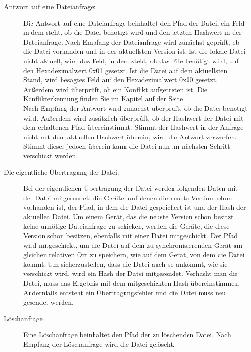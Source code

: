\begin{description}
	\item [{Antwort auf eine Dateianfrage:}]
		Die Antwort auf eine Dateianfrage beinhaltet den Pfad der Datei, ein Feld in dem steht, ob die Datei benötigt wird und den letzten Hashwert in der Dateianfrage. Nach Empfang der Dateianfrage wird zunächst geprüft, ob die Datei vorhanden und in der aktuellsten Version ist.  Ist die lokale Datei nicht aktuell, wird das Feld, in dem steht, ob das File benötigt wird, auf den Hexadezimalwert 0x01 gesetzt. Ist die Datei auf dem aktuellsten Stand, wird besagtes Feld auf den Hexadezimalwert 0x00 gesetzt. Außerdem wird überprüft, ob ein Konflikt aufgetreten ist. Die Konflikterkennung finden Sie im Kapitel  auf der Seite \pageref{Konflikterkennung}.\\
		Nach Empfang der Antwort wird zunächst überprüft, ob die Datei benötigt wird. Außerdem wird zusätzlich überprüft, ob der Hashwert der Datei mit dem erhaltenen Pfad übereinstimmt. Stimmt der Hashwert in der Anfrage nicht mit dem aktuellen Hashwert überein, wird die Antwort verworfen. Stimmt dieser jedoch überein kann die Datei nun im nächsten Schritt verschickt werden.
		
	\item [{Die eigentliche Übertragung der Datei:}]
		Bei der eigentlichen Übertragung der Datei werden folgenden Daten mit der Datei mitgesendet: die Geräte, auf denen die neuste Version schon vorhanden ist, der Pfad, in dem die Datei gespeichert ist und der Hash der aktuellen Datei. Um einem Gerät, das die neuste Version schon besitzt keine unnötige Dateianfrage zu schicken, werden die Geräte, die diese Version schon besitzen, ebenfalls mit einer Datei mitgeschickt. Der Pfad wird mitgeschickt, um die Datei auf dem zu synchronisierenden Gerät am gleichen relativen Ort zu speichern, wie auf dem Gerät, von dem die Datei kommt. Um sicherzustellen, dass die Datei auch so ankommt, wie sie verschickt wird, wird ein Hash der Datei mitgesendet. Verhasht man die Datei, muss das Ergebnis mit dem mitgeschickten Hash übereinstimmen. Andernfalls entsteht ein Übertragungsfehler und die Datei muss neu gesendet werden.
		
	\item [{Löschanfrage}]
		Eine Löschanfrage beinhaltet den Pfad der zu löschenden Datei. Nach Empfang der Löschanfrage wird die Datei gelöscht.
		
\end{description}

